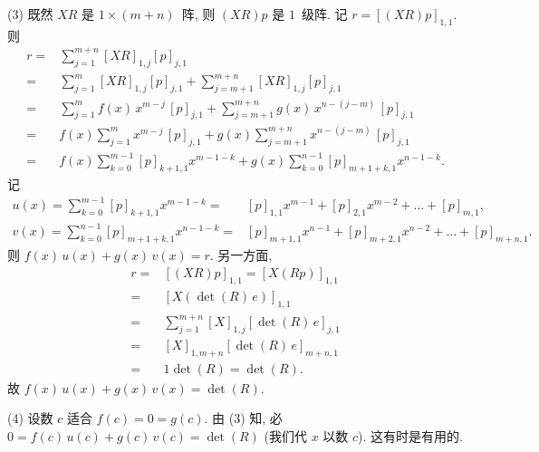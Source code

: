 \begin{example}

    (3)
    既然 \(XR\) 是 \(1 \times (m+n)\)~阵,
    则 \((XR)p\) 是 \(1\)~级阵.
    记 \(r = [(XR)p]_{1,1}\).
    则
    \begin{align*}
        r
        = {} &
        \sum_{j = 1}^{m+n}
        {[XR]_{1,j} [p]_{j,1}}
        \\
        = {} &
        \sum_{j = 1}^{m}
        {[XR]_{1,j} [p]_{j,1}}
        +
        \sum_{j = m+1}^{m+n}
        {[XR]_{1,j} [p]_{j,1}}
        \\
        = {} &
        \sum_{j = 1}^{m}
        {f(x)\, x^{m-j}\, [p]_{j,1}}
        +
        \sum_{j = m+1}^{m+n}
        {g(x)\, x^{n-(j-m)}\, [p]_{j,1}}
        \\
        = {} &
        f(x)
        \sum_{j = 1}^{m}
        {x^{m-j}\, [p]_{j,1}}
        +
        g(x)
        \sum_{j = m+1}^{m+n}
        {x^{n-(j-m)}\, [p]_{j,1}}
        \\
        = {} &
        f(x)
        \sum_{k = 0}^{m-1}
        {[p]_{k+1,1} x^{m-1-k}}
        +
        g(x)
        \sum_{k = 0}^{n-1}
        {[p]_{m+1+k,1} x^{n-1-k}}.
    \end{align*}
    记
    \begin{align*}
        u(x)
        = \sum_{k = 0}^{m-1} {[p]_{k+1,1} x^{m-1-k}}
        = {} &
        [p]_{1,1} x^{m-1} + [p]_{2,1} x^{m-2}
        + \dots + [p]_{m,1},
        \\
        v(x)
        = \sum_{k = 0}^{n-1} {[p]_{m+1+k,1} x^{n-1-k}}
        = {} &
        [p]_{m+1,1} x^{n-1} + [p]_{m+2,1} x^{n-2}
        + \dots + [p]_{m+n,1}.
    \end{align*}
    则
    \(f(x)\, u(x) + g(x)\, v(x) = r\).
    另一方面,
    \begin{align*}
        r
        = {} &
        [(XR)p]_{1,1}
            =
            [X(Rp)]_{1,1}
        \\
        = {} &
        [X(\det {(R)}\, e)]_{1,1}
        \\
        = {} &
        \sum_{j = 1}^{m + n}
        {[X]_{1,j} [\det {(R)}\, e]_{j,1}}
        \\
        = {} &
        [X]_{1,m+n} [\det {(R)}\, e]_{m+n,1}
        \\
        = {} &
        1 \det {(R)}
        =
        \det {(R)}.
    \end{align*}
    故
    \(f(x)\, u(x) + g(x)\, v(x) = \det {(R)}\).

    (4)
    设数 \(c\) 适合 \(f(c) = 0 = g(c)\).
    由 (3) 知, 必
    \(0 = f(c)\, u(c) + g(c)\, v(c) = \det {(R)}\)
    (我们代 \(x\) 以数 \(c\)).
    这有时是有用的.
\end{example}

